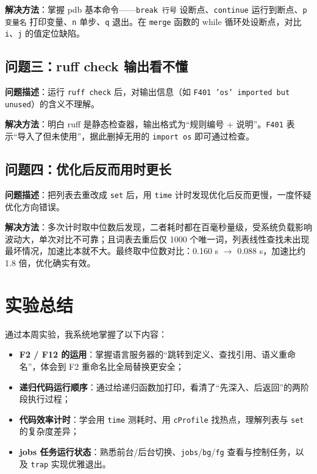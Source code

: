 \documentclass[a4paper, 12pt]{article}
\begin{document}
\textbf{解决方法}：掌握 pdb 基本命令——\texttt{break 行号} 设断点、\texttt{continue} 运行到断点、\texttt{p 变量名} 打印变量、\texttt{n} 单步、\texttt{q} 退出。在 \texttt{merge} 函数的 while 循环处设断点，对比 \texttt{i}、\texttt{j} 的值定位缺陷。

\subsection{问题三：ruff check 输出看不懂}

\textbf{问题描述}：运行 \texttt{ruff check} 后，对输出信息（如 \texttt{F401 'os' imported but unused}）的含义不理解。

\textbf{解决方法}：明白 ruff 是静态检查器，输出格式为“规则编号 + 说明”。\texttt{F401} 表示“导入了但未使用”，据此删掉无用的 \texttt{import os} 即可通过检查。

\subsection{问题四：优化后反而用时更长}

\textbf{问题描述}：把列表去重改成 \texttt{set} 后，用 \texttt{time} 计时发现优化后反而更慢，一度怀疑优化方向错误。

\textbf{解决方法}：多次计时取中位数后发现，二者耗时都在百毫秒量级，受系统负载影响波动大，单次对比不可靠；且词表去重后仅 1000 个唯一词，列表线性查找未出现最坏情况，加速比本就不大。最终取中位数对比：0.160 s $\rightarrow$ 0.088 s，加速比约 1.8 倍，优化确实有效。

\section{实验总结}

通过本周实验，我系统地掌握了以下内容：

\begin{itemize}
  \item \textbf{F2 / F12 的运用}：掌握语言服务器的“跳转到定义、查找引用、语义重命名”，体会到 F2 重命名比全局替换更安全；
  \item \textbf{递归代码运行顺序}：通过给递归函数加打印，看清了“先深入、后返回”的两阶段执行过程；
  \item \textbf{代码效率计时}：学会用 \texttt{time} 测耗时、用 \texttt{cProfile} 找热点，理解列表与 \texttt{set} 的复杂度差异；
  \item \textbf{jobs 任务运行状态}：熟悉前台/后台切换、\texttt{jobs}/\texttt{bg}/\texttt{fg} 查看与控制任务，以及 \texttt{trap} 实现优雅退出。
\end{itemize}
\end{document}

